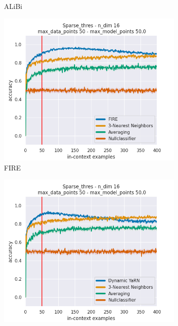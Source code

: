 \documentclass[letterpaper]{article} %
\begin{document}
\begin{figure}[tp]
\begin{subfigure}[t]{0.24\linewidth}
        \caption{ALiBi}
    \end{subfigure}
    \begin{subfigure}[t]{0.24\linewidth}
        \includegraphics[width=\linewidth]{AnonymousSubmission/LaTeX/imgs/experiments/threshold/fire.png}
        \caption{FIRE}
    \end{subfigure}
    \begin{subfigure}[t]{0.24\linewidth}
        \includegraphics[width=\linewidth]{AnonymousSubmission/LaTeX/imgs/experiments/threshold/dynamic-yarn.png}

\end{subfigure}
\end{figure}
\end{document}
